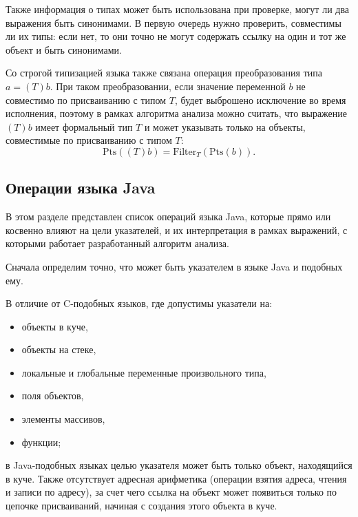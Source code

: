 \documentclass[14pt,titlepage]{extarticle}
\newcommand{\Pts}[1]{\textrm{Pts}(#1)}
\newcommand{\Filter}[2]{\textrm{Filter}_{#1}(#2)}
\newcommand{\eng}[1]{{\English#1}}
\newcommand{\java}{\eng{Java}\xspace}
\begin{document}
        Также информация о типах может быть использована при проверке, могут ли
        два выражения быть синонимами. В первую очередь нужно проверить,
        совместимы ли их типы: если нет, то они точно не могут содержать ссылку
        на один и тот же объект и быть синонимами.

        Со строгой типизацией языка также связана операция преобразования типа
        $a = (T)b$.
        При таком преобразовании, если значение переменной $b$ не совместимо
        по присваиванию с типом $T$, будет выброшено исключение во время
        исполнения, поэтому в рамках алгоритма анализа можно считать, что
        выражение $(T)b$ имеет формальный тип $T$ и может указывать только на
        объекты, совместимые по присваиванию с типом $T$:
        \[\Pts{(T)b} = \Filter{T}{\Pts{b}}.\]

    \subsection{\texorpdfstring{Операции языка \java}
                               {Операции языка Java}}
      \label{section:operations}

      В этом разделе представлен список операций языка \java, которые прямо или
      косвенно влияют на цели указателей, и их интерпретация в рамках
      выражений, с которыми работает разработанный алгоритм анализа.

      Сначала определим точно, что может быть указателем в языке \java и
      подобных ему.

      В отличие от C-подобных языков, где допустимы указатели на:
      \begin{itemize}
        \item объекты в куче,
        \item объекты на стеке,
        \item локальные и глобальные переменные произвольного типа,
        \item поля объектов,
        \item элементы массивов,
        \item функции;
      \end{itemize}
      в \java-подобных языках целью указателя может быть только объект,
      находящийся в куче. Также отсутствует адресная арифметика (операции
      взятия адреса, чтения и записи по адресу), за счет чего ссылка на объект
      может появиться только по цепочке присваиваний, начиная с создания этого
      объекта в куче.
\end{document}
